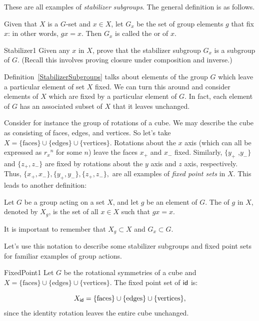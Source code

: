  These are all examples of \emph{stabilizer subgroups}. The general definition is as follows.

\begin {defn}\label {StabilizerSubgroups} 
Given that $X$ is a $G$-set and  $x \in X$, let $G_x$ be the set of  group elements $g$ that fix $x$:  in other words, $gx=x$.  Then $G_x$ is called the  or  of $x$.
\end{defn}

\begin {exercise}{Stabilizer1}
Given any $x$ in $X$, prove that the stabilizer subgroup $G_x$  is a subgroup of $G$.  (Recall this involves proving closure under composition and inverse.)
\end {exercise}

Definition~\ref{StabilizerSubgroups} talks about elements of the group $G$ which leave a particular element of set $X$ fixed. We can turn this around and consider elements of $X$ which are fixed by a particular element of $G$. In fact, each element of $G$ has an associated subset of $X$ that it leaves unchanged. 

Consider for instance the group of rotations of a cube. We may describe the cube as consisting of faces, edges, and vertices. So let's take   $X=\{\text{faces}\}\cup\{\text{edges}\}\cup\{\text{vertices}\}$.  Rotations about the $x$ axis (which can all be expressed as ${r_x}^n$ for some $n$) leave the faces $x_+$ and $x_-$ fixed. Similarly, $\{y_+$ ,$y_-\}$ and $\{z_+,z_-\}$ are  fixed by rotations about the $y$ axis and $z$ axis, respectively.   Thus, $\{x_+,x_-\},\{y_+,y_-\},\{z_+,z_-\},$  are all examples of \emph{fixed point sets} in $X$.
This leads to another definition:

\begin{defn} \label {FixedPoint}
Let $G$ be a group acting on a set $X$, and let $g$ be
an element of $G$. The  of $g$ in $X$, denoted by $X_g$, is the set of 
all $x \in X$ such that $gx = x$.
\end{defn}
\noindent
It is important to remember that $X_g \subset X$ and $G_x \subset G$. 

Let's use this notation to describe some stabilizer subgroups and fixed point sets for familiar examples of group actions.

\begin {example}{FixedPoint1}
Let $G$ be the rotational symmetries of a cube and $X=\{\text{faces}\}\cup\{\text{edges}\}\cup\{\text{vertices}\}$.
The fixed point set of $\sf{id}$ is: 

$$X_{\sf{id}}=\{\text{faces}\}\cup\{\text{edges}\}\cup\{\text{vertices}\},$$
since the identity rotation  leaves the entire cube unchanged.  
\end {example}

